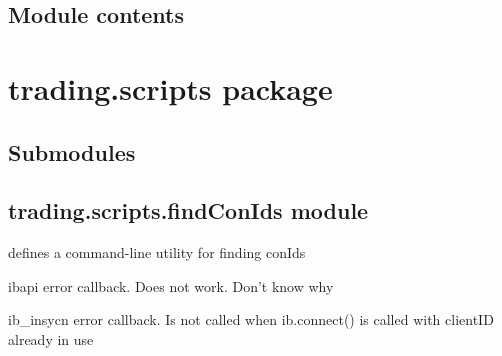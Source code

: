 \documentclass[letterpaper,10pt,english]{sphinxmanual}
\begin{document}
\section{Module contents}
\label{\detokenize{trading:module-contents}}\label{\detokenize{trading:module-trading}}

\chapter{trading.scripts package}
\label{\detokenize{trading.scripts:trading-scripts-package}}\label{\detokenize{trading.scripts::doc}}

\section{Submodules}
\label{\detokenize{trading.scripts:submodules}}

\section{trading.scripts.findConIds module}
\label{\detokenize{trading.scripts:module-trading.scripts.findConIds}}\label{\detokenize{trading.scripts:trading-scripts-findconids-module}}
defines a command-line utility for finding conIds

\begin{fulllineitems}
\label{\detokenize{trading.scripts:trading.scripts.findConIds.error}}
ibapi error callback. Does not work. Don’t know why

\end{fulllineitems}


\begin{fulllineitems}
\label{\detokenize{trading.scripts:trading.scripts.findConIds.myErrorCallback}}
ib\_insycn error callback. Is not called when ib.connect() is called with clientID already in use

\end{fulllineitems}
\end{document}
